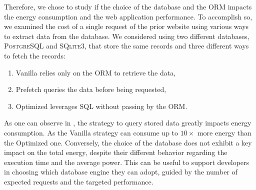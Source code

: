 Therefore, we chose to study if the choice of the database and the ORM impacts the energy consumption and the web application performance.
To accomplish so, we examined the cost of a single request of the prior website using various ways to extract data from the database.
We considered using two different databases, \textsc{PostgreSQL} and \textsc{SQlite3}, that store the same records and three different ways to fetch the records:
\begin{enumerate}
    \item \textsf{Vanilla} relies only on the ORM to retrieve the data,
    \item \textsf{Prefetch} queries the data before being requested,
    \item \textsf{Optimized} leverages SQL without passing by the ORM.
\end{enumerate}

As one can observe in , the strategy to query stored data greatly impacts energy consumption.
As the \textsf{Vanilla} strategy can consume up to $10\times$ more energy than the \textsf{Optimized} one.
Conversely, the choice of the database does not exhibit a key impact on the total energy, despite their different behavior regarding the execution time and the average power.
This can be useful to support developers in choosing which database engine they can adopt, guided by the number of expected requests and the targeted performance.

